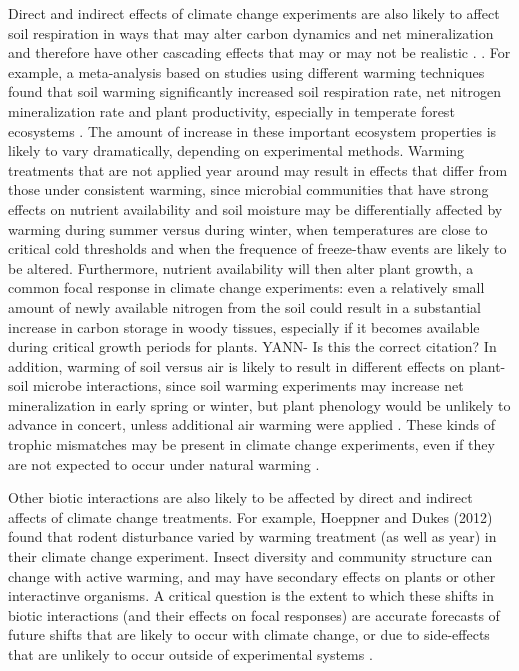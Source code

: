 \documentclass{article}
\begin{document}
\par Direct and indirect effects of climate change experiments are also likely to affect soil respiration in ways that may alter carbon dynamics and net mineralization and therefore have other cascading effects that may or may not be realistic \citep{deltoro2015}. . For example, a meta-analysis based on studies using different warming techniques found that soil warming significantly increased soil respiration rate, net nitrogen mineralization rate and plant productivity, especially in temperate forest ecosystems \citep {rustad2001}. The amount of increase in these important ecosystem properties is likely to vary dramatically, depending on experimental methods. Warming treatments that are not applied year around \citep[e.g.][]{clark2014a,clark2014b} may result in effects that differ from those under consistent warming, since microbial communities that have strong effects on nutrient availability and soil moisture may be differentially affected by warming during summer versus during winter, when temperatures are close to critical cold thresholds and when the frequence of freeze-thaw events are likely to be altered\citep{rivkina2000,mcdaniel2014}. Furthermore, nutrient availability will then alter plant growth, a common focal response in climate change experiments: even a relatively small amount of newly available nitrogen from the soil could result in a substantial increase in carbon storage in woody tissues, especially if it becomes available during critical growth periods for plants. \citep{fatichi2014} YANN- Is this the correct citation? In addition, warming of soil versus air is likely to result in different effects on plant-soil microbe interactions, since soil warming experiments may increase net mineralization in early spring or winter, but plant phenology would be unlikely to advance in concert, unless additional air warming were applied \citep{du2014}.
These kinds of trophic mismatches may be present in climate change experiments, even if they are not expected to occur under natural warming \citep{kharouba2015}. 
\par Other biotic interactions are also likely to be affected by direct and indirect affects of climate change treatments. For example, Hoeppner and Dukes (2012) found that rodent disturbance varied by warming treatment (as well as year) in their climate change experiment. Insect diversity and community structure can change with active warming, and may have secondary effects on plants or other interactinve organisms\citep{pelini2014,diamond2016}. A critical question is the extent to which these shifts in biotic interactions (and their effects on focal responses) are accurate forecasts of future shifts that are likely to occur with climate change, or due to side-effects that are unlikely to occur outside of experimental systems \citep{diamond2013}.
\end{document}
